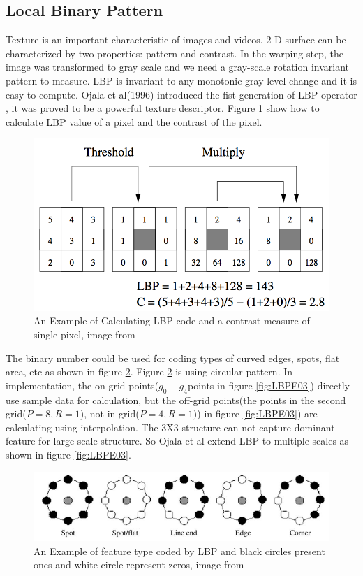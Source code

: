 \subsection{Local Binary Pattern}
Texture is an important characteristic of images and videos. 2-D surface can be characterized by two properties: pattern and contrast. In the warping step, the image was transformed to gray scale and we need a gray-scale rotation invariant pattern to measure. LBP is invariant to any monotonic gray level change and it is easy to compute. Ojala et al(1996) introduced the fist generation of LBP operator \cite{shan2009facial}, it was proved to be a powerful texture descriptor. Figure \ref{fig:LBPE01} show how to calculate LBP value of a pixel and the contrast of the pixel.
\begin{figure}[ht]
\centering
\captionsetup{justification=centering, margin=3cm}
\includegraphics[width = .6\textwidth]{imgs/LBP_Example_1.png}
\caption{An Example of Calculating LBP code and \newline a contrast measure of single pixel, image from \cite{maenpaa2005texture}}
\label{fig:LBPE01}
\end{figure}
The binary number could be used for coding types of curved edges, spots, flat area, etc as shown in figure \ref{fig:LBPE02}. Figure \ref{fig:LBPE02} is using circular pattern. In implementation, the on-grid points($g_{0}-g_{4}$points in figure \ref{fig:LBPE03}) directly use sample data for calculation, but the off-grid points(the points in the second grid($P=8,R=1$), not in grid($P=4,R=1)$) in figure \ref{fig:LBPE03}) are calculating using interpolation. The 3X3 structure can not capture dominant feature for large scale structure\cite{shan2009facial}. So Ojala et al extend LBP to multiple scales as shown in figure \ref{fig:LBPE03}.
\begin{figure}[ht]
\centering
\captionsetup{justification=centering, margin=3cm}
\includegraphics[width = .6\textwidth]{imgs/LBP_Example_2.png}
\caption{An Example of feature type coded by LBP and \newline black circles present ones and white circle represent zeros, image from \cite{shan2009facial}}
\label{fig:LBPE02}
\end{figure}
